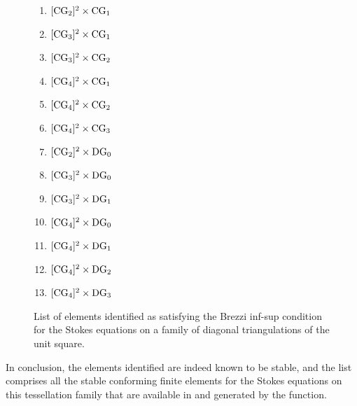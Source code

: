 \begin{figure}
  \centering
  \begin{minipage}[t]{0.3\linewidth}
    \begin{enumerate}
    \item $[\mathrm{CG}_{2}]^{2} \times \mathrm{CG}_{1}$
    \item $[\mathrm{CG}_{3}]^{2} \times \mathrm{CG}_{1}$
    \item $[\mathrm{CG}_{3}]^{2} \times \mathrm{CG}_{2}$
    \item $[\mathrm{CG}_{4}]^{2} \times \mathrm{CG}_{1}$
    \item $[\mathrm{CG}_{4}]^{2} \times \mathrm{CG}_{2}$
    \end{enumerate}
  \end{minipage}
  \begin{minipage}[t]{0.3\linewidth}
    \begin{enumerate}
      \setcounter{enumi}{5}
    \item $[\mathrm{CG}_{4}]^{2} \times \mathrm{CG}_{3}$
    \item $[\mathrm{CG}_{2}]^{2} \times \mathrm{DG}_{0}$
    \item $[\mathrm{CG}_{3}]^{2} \times \mathrm{DG}_{0}$
    \item $[\mathrm{CG}_{3}]^{2} \times \mathrm{DG}_{1}$
    \end{enumerate}
  \end{minipage}
  \begin{minipage}[t]{0.3\linewidth}
    \begin{enumerate}
      \setcounter{enumi}{9}
    \item $[\mathrm{CG}_{4}]^{2} \times \mathrm{DG}_{0}$
    \item $[\mathrm{CG}_{4}]^{2} \times \mathrm{DG}_{1}$
    \item $[\mathrm{CG}_{4}]^{2} \times \mathrm{DG}_{2}$
    \item $[\mathrm{CG}_{4}]^{2} \times \mathrm{DG}_{3}$
    \end{enumerate}
  \end{minipage}
  \caption{List of elements identified as satisfying the Brezzi
    inf-sup condition for the Stokes equations on a family of diagonal
    triangulations of the unit square.}
  \label{rognes:fig:stokeslist}
\end{figure}

In conclusion, the elements identified are indeed known to be stable,
and the list comprises all the stable conforming finite elements for
the Stokes equations on this tessellation family that are available in
\ffc{} and generated by the  function.


